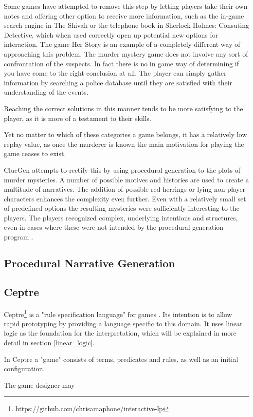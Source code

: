 Some games have attempted to remove this step by letting players take their own notes and offering other option to receive more information, such as the in-game search engine in The Shivah or the telephone book in Sherlock Holmes: Consuting Detective, which when used correctly open up potential new options for interaction.
The game Her Story is an example of a completely different way of approaching this problem.
The murder mystery game does not involve any sort of confrontation of the suspects.
In fact there is no in game way of determining if you have come to the right conclusion at all.
The player can simply gather information by searching a police database until they are satisfied with their understanding of the events.

Reaching the correct solutions in this manner tends to be more satisfying to the player, as it is more of a testament to their skills.

Yet no matter to which of these categories a game belongs, it has a relatively low replay value, as once the murderer is known the main motivation for playing the game ceases to exist.

ClueGen attempts to rectify this by using procedural generation to the plots of murder mysteries.
A number of possible motives and histories are used to create a multitude of narratives.
The addition of possible red herrings or lying non-player characters enhances the complexity even further.
Even with a relatively small set of predefined options the resulting mysteries were sufficiently interesting to the players.
The players recognized complex, underlying intentions and structures, even in cases where these were not intended by the procedural generation program \cite{AIIDE1614070}.

\subsection{Procedural Narrative Generation}


\subsection{Ceptre}

Ceptre\footnote{https://github.com/chrisamaphone/interactive-lp} is a "rule specification language" for games \cite{martens_2015}.
Its intention is to allow rapid prototyping by providing a language specific to this domain.
It uses linear logic as the foundation for the interpretation, which will be explained in more detail in section \ref{linear_logic}.

In Ceptre a "game" consists of terms, predicates and rules, as well as an initial configuration.

The game designer may 

